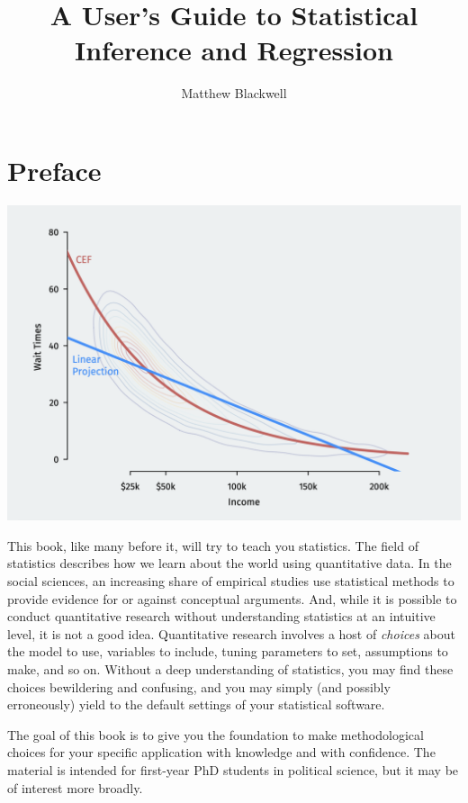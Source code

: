 \documentclass[
  13pt,
  letterpaper,
  DIV=11,
  numbers=noendperiod]{scrreprt}
\title{A User's Guide to Statistical Inference and Regression}
\author{Matthew Blackwell}
\date{}
\renewcommand*\contentsname{Table of contents}
\newcommand\contentsname{Table of contents}
\theoremstyle{plain}
\theoremstyle{definition}
\theoremstyle{definition}
\theoremstyle{remark}
\begin{document}
\maketitle

\renewcommand*\contentsname{Table of contents}
{
\hypersetup{linkcolor=}
\setcounter{tocdepth}{2}
\tableofcontents
}

\chapter*{Preface}\label{preface}


\includegraphics{assets/img/linear-approximation.png}

This book, like many before it, will try to teach you statistics. The
field of statistics describes how we learn about the world using
quantitative data. In the social sciences, an increasing share of
empirical studies use statistical methods to provide evidence for or
against conceptual arguments. And, while it is possible to conduct
quantitative research without understanding statistics at an intuitive
level, it is not a good idea. Quantitative research involves a host of
\emph{choices} about the model to use, variables to include, tuning
parameters to set, assumptions to make, and so on. Without a deep
understanding of statistics, you may find these choices bewildering and
confusing, and you may simply (and possibly erroneously) yield to the
default settings of your statistical software.

The goal of this book is to give you the foundation to make
methodological choices for your specific application with knowledge and
with confidence. The material is intended for first-year PhD students in
political science, but it may be of interest more broadly.
\end{document}
